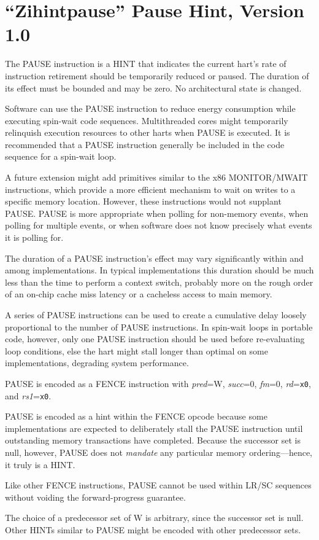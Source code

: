 \chapter{``Zihintpause'' Pause Hint, Version 1.0}
\label{chap:zihintpause}

The PAUSE instruction is a HINT that indicates the current hart's rate of
instruction retirement should be temporarily reduced or paused.  The duration of its
effect must be bounded and may be zero.  No architectural state is changed.

\begin{commentary}
Software can use the PAUSE instruction to reduce energy consumption while
executing spin-wait code sequences.  Multithreaded cores might temporarily
relinquish execution resources to other harts when PAUSE is executed.
It is recommended that a PAUSE instruction generally be included in the code
sequence for a spin-wait loop.

A future extension might add primitives similar to the x86 MONITOR/MWAIT
instructions, which provide a more efficient mechanism to wait on writes to
a specific memory location.
However, these instructions would not supplant PAUSE.
PAUSE is more appropriate when polling for non-memory events, when polling for
multiple events, or when software does not know precisely what events it is
polling for.

The duration of a PAUSE instruction's effect may vary significantly within and
among implementations.
In typical implementations this duration should be much less than the time to perform a context switch, probably more on the rough order of an on-chip cache miss latency or a cacheless access to main memory.

A series of PAUSE instructions can be used to create a cumulative delay loosely
proportional to the number of PAUSE instructions.
In spin-wait loops in portable code, however, only one PAUSE instruction should
be used before re-evaluating loop conditions, else the hart might stall longer
than optimal on some implementations, degrading system performance.
\end{commentary}

PAUSE is encoded as a FENCE instruction with {\em pred}=W, {\em succ}=0,
{\em fm}=0, {\em rd}={\tt x0}, and {\em rs1}={\tt x0}.

\begin{commentary}
PAUSE is encoded as a hint within the FENCE opcode because some
implementations are expected to deliberately stall the PAUSE instruction until outstanding
memory transactions have completed.
Because the successor set is null, however, PAUSE does not {\em mandate} any
particular memory ordering---hence, it truly is a HINT.

Like other FENCE instructions, PAUSE cannot be used within LR/SC sequences
without voiding the forward-progress guarantee.

The choice of a predecessor set of W is arbitrary, since the successor set is
null.
Other HINTs similar to PAUSE might be encoded with other predecessor sets.
\end{commentary}
